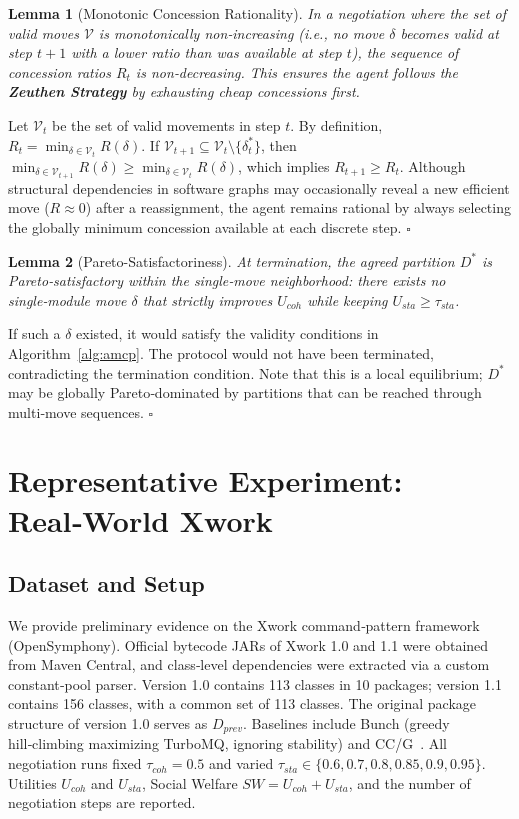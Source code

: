 \documentclass[conference]{IEEEtran}
\newtheorem{lemma}{Lemma}
\renewenvironment{proof}{{\bfseries Proof.}}{\hfill$\square$}
\begin{document}
\begin{lemma}[Monotonic Concession Rationality]
\label{lem:rationality}
In a negotiation where the set of valid moves $\mathcal{V}$ is monotonically non‑increasing (i.e., no move $\delta$ becomes valid at step $t+1$ with a lower ratio than was available at step $t$), the sequence of concession ratios $R_t$ is non‑decreasing. This ensures the agent follows the \textbf{Zeuthen Strategy} by exhausting cheap concessions first.
\end{lemma}
\begin{proof}
Let $\mathcal{V}_t$ be the set of valid movements in step $t$. By definition, $R_t = \min_{\delta \in \mathcal{V}_t} R(\delta)$. If $\mathcal{V}_{t+1} \subseteq \mathcal{V}_t \setminus \{\delta^*_t\}$, then $\min_{\delta \in \mathcal{V}_{t+1}} R(\delta) \ge \min_{\delta \in \mathcal{V}_t} R(\delta)$, which implies $R_{t+1} \ge R_t$. Although structural dependencies in software graphs may occasionally reveal a new efficient move ($R \approx 0$) after a reassignment, the agent remains rational by always selecting the globally minimum concession available at each discrete step.
\end{proof}

\begin{lemma}[Pareto-Satisfactoriness]
\label{lem:pareto}
At termination, the agreed partition $D^*$ is Pareto‑satisfactory within the single‑move neighborhood: there exists no single‑module move $\delta$ that strictly improves $U_{coh}$ while keeping $U_{sta} \ge \tau_{sta}$.
\end{lemma}
\begin{proof}
If such a $\delta$ existed, it would satisfy the validity conditions in Algorithm~\ref{alg:amcp}. The protocol would not have been terminated, contradicting the termination condition. Note that this is a local equilibrium; $D^*$ may be globally Pareto‑dominated by partitions that can be reached through multi‑move sequences.
\end{proof}

\section{Representative Experiment: Real‑World Xwork}
\label{sec:results}

\subsection{Dataset and Setup}
We provide preliminary evidence on the Xwork command‑pattern framework (OpenSymphony). Official bytecode JARs of Xwork 1.0 and 1.1 were obtained from Maven Central, and class‑level dependencies were extracted via a custom constant‑pool parser. Version 1.0 contains 113 classes in 10 packages; version 1.1 contains 156 classes, with a common set of 113 classes. The original package structure of version 1.0 serves as $D_{prev}$. Baselines include Bunch (greedy hill‑climbing maximizing TurboMQ, ignoring stability) and CC/G~\cite{Ibrahim2014}. All negotiation runs fixed $\tau_{coh}=0.5$ and varied $\tau_{sta} \in \{0.6,0.7,0.8,0.85,0.9,0.95\}$. Utilities $U_{coh}$ and $U_{sta}$, Social Welfare $SW=U_{coh}+U_{sta}$, and the number of negotiation steps are reported.
\end{document}
